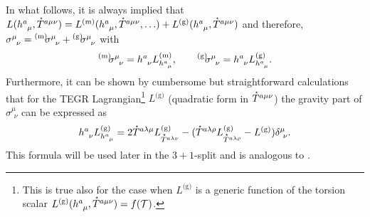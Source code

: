 \documentclass[
10pt, %
a4paper, %
oneside, %
headinclude,footinclude, %
BCOR5mm, %
]{scrartcl}
\newcommand{\tetrsymbol}{h}
\newcommand{\tetr}[2]{\tetrsymbol^{#1}_{\phantom{#1}#2}}
\newcommand{\Laghodge}{L}%
\newcommand{\EMmat}[2]{\sigma^{#1}_{\ \,#2}}
\newcommand{\mat}[1]{\prescript{\text{(m)}}{}{\hspace{-0.1cm}#1}}
\newcommand{\gra}[1]{\prescript{\text{(g)}}{}{\hspace{-0.1cm}#1}}
\newcommand{\HDT}[1]{\accentset{\star}{T}^{#1}}
\newcommand{\Tscal}{\mathcal{T}}		%
\begin{document}
In what follows, it is always implied that $ \Laghodge(\tetr{a}{\mu},\HDT{a\mu\nu}) = 
\Laghodge^\text{(m)}(\tetr{a}{\mu},\HDT{a\mu\nu},\ldots) + 
\Laghodge^\text{(g)}(\tetr{a}{\mu},\HDT{a\mu\nu})$ and therefore, $ \EMmat{\mu}{\nu} = 
\mat{\EMmat{\mu}{\nu}} + \gra{\EMmat{\mu}{\nu}}$ with
\begin{equation}\label{eqn.sigmas}
	\mat{\EMmat{\mu}{\nu}} = \tetr{a}{\nu} L^\text{(m)}_{\tetr{a}{\mu}},
	\qquad
	\gra{\EMmat{\mu}{\nu}} = \tetr{a}{\nu} L^\text{(g)}_{\tetr{a}{\mu}}.
\end{equation}
Furthermore, it can be shown by cumbersome but straightforward calculations that for the TEGR 
Lagrangian\footnote{This is true 
	also for the case when $ \Laghodge^\text{(g)}$ is a generic 
	function of the torsion scalar $ \Laghodge^\text{(g)}(\tetr{a}{\mu},\HDT{a\mu\nu}) = f(\Tscal) 
	$.} $ \Laghodge^\text{(g)} $ (quadratic form 
in $ \HDT{a\mu\nu} $) the gravity part of $ \EMmat{\mu}{\nu} $ can be 
expressed as
\begin{equation}\label{eqn.TEGR.vacuum}
	\tetr{a}{\nu} \Laghodge^\text{(g)}_{\tetr{a}{\mu}} = 
	2 \HDT{a\lambda\mu}\Laghodge^\text{(g)}_{\HDT{a\lambda\nu}} - 
	(\HDT{a\lambda\rho}\Laghodge^\text{(g)}_{\HDT{a\lambda\rho}} - \Laghodge^\text{(g)}) 
	\delta^\mu_{\ \nu}.
\end{equation}
This formula will be used later in the $ 3+1 $-split and is analogous to
\cite[Eq.(10.13)]{AldrovandiPereiraBook}. 
\end{document}
